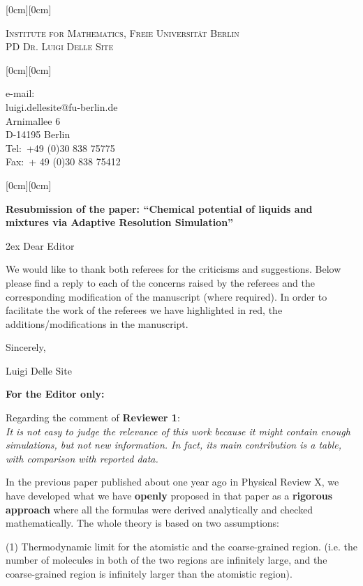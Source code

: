 \documentclass[12pt]{article}
\newcommand{\kopf}{\noindent
\raisebox{2.5cm}[0cm][0cm]
{
\parbox[c]{0.88\textwidth}
{
\begin{center}
\textsc{\large Institute for Mathematics, Freie Universit\"{a}t Berlin}\\
\textsc{ PD Dr. Luigi Delle Site}
\end{center}
}
}}
\begin{document}
\kopf
\vspace{2cm}
\hfill\raisebox{1.5cm}[0cm][0cm]
{\parbox[t]{0.34\textwidth}
{e-mail:\\
{\small luigi.dellesite@fu-berlin.de}\\
Arnimallee 6\\
D-14195 Berlin\\
Tel:\ +49 (0)30 838 75775 \\
Fax:\ + 49 (0)30 838 75412 \\
}}
\vspace{3cm}
\noindent\raisebox{1.5cm}[0cm][0cm]
{}
\vspace{1cm}

\textbf{Resubmission of the paper: ``Chemical potential of liquids and mixtures via Adaptive Resolution Simulation''}

\vspace{1cm}
\parskip 2ex
Dear Editor

We would like to thank both referees for the criticisms and suggestions.
Below please find a reply to each of the concerns raised by the referees and the
corresponding modification of the manuscript (where required).
In order to facilitate the work of the referees we have highlighted in red, the additions/modifications in the manuscript.

\vskip 1cm
Sincerely,

Luigi Delle Site

\newpage

{\bf For the Editor only:}


Regarding the comment of {\bf Reviewer 1}:\\
{\color{blue} \it  It is not easy to judge the relevance of this
  work because it might contain enough simulations, but not new information. In fact, its main contribution is a table, with comparison with reported data.}

In the previous paper published about one year ago in Physical Review X,
we have developed what we have {\bf openly} proposed in that paper as a {\bf rigorous approach} where all the formulas were derived analytically and checked mathematically.
The whole theory is based on two assumptions:

(1) Thermodynamic limit for the {atomistic and the coarse-grained region. (i.e. the number of molecules in both of the two
  regions are infinitely large, and the coarse-grained region is infinitely larger than the atomistic region)}.
\end{document}
